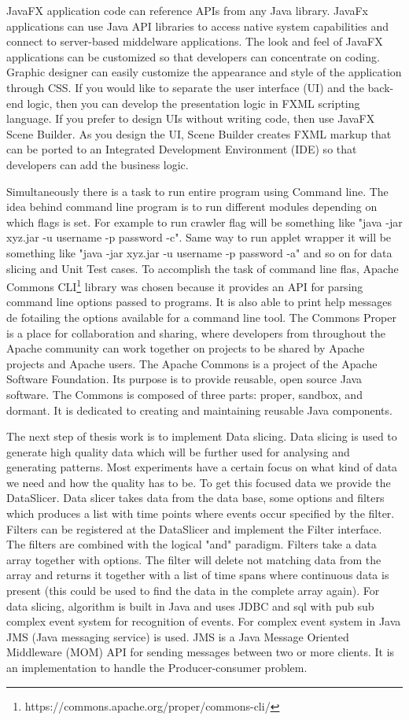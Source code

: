 \documentclass[article,type=msc,colorback,accentcolor=tud9c,twoside,11pt]{tudthesis}
\begin{document}
	JavaFX application code can reference APIs from any Java library. JavaFx applications can use Java API libraries to access native system capabilities and connect to server-based middelware applications. The look and feel of JavaFX applications can be customized so that developers can concentrate on coding. Graphic designer can easily customize the appearance and style of the application through CSS. If you would like to separate the user interface (UI) and the back-end logic, then you can develop the presentation logic in FXML scripting language. If you prefer to design UIs without writing code, then use JavaFX Scene Builder. As you design the UI, Scene Builder creates FXML markup that can be ported to an Integrated Development Environment (IDE) so that developers can add the business logic.
	
	Simultaneously there is a task to run entire program using Command line. The idea behind command line program is to run different modules depending on which flags is set. For example to run crawler flag will be something like "java -jar xyz.jar -u username -p password -c". Same way to run applet wrapper it will be something like  "java -jar xyz.jar -u username -p password -a" and so on for data slicing and Unit Test cases. To accomplish the task of command line flas, Apache Commons CLI\footnote{https://commons.apache.org/proper/commons-cli/} library was chosen because it provides an API for parsing command line options passed to programs. It is also able to print help messages de fotailing the options available for a command line tool. The Commons Proper is a place for collaboration and sharing, where developers from throughout the Apache community can work together on projects to be shared by Apache projects and Apache users. The Apache Commons is a project of the Apache Software Foundation. Its purpose is to provide reusable, open source Java software. The Commons is composed of three parts: proper, sandbox, and dormant. It is dedicated to creating and maintaining reusable Java components.
	
	The next step of thesis work is to implement Data slicing. Data slicing is used to generate high quality data which will be further used for analysing and generating patterns. Most experiments have a certain focus on what kind of data we need and how the quality has to be. To get this focused data we provide the DataSlicer. Data slicer takes data from the data base, some options and filters which produces a list with time points where events occur specified by the filter. Filters can be registered at the DataSlicer and implement the Filter interface. The filters are combined with the logical "and" paradigm. Filters take a data array together with options. The filter will delete not matching data from the array and returns it together with a list of time spans where continuous data is present (this could be used to find the data in the complete array again). For data  slicing, algorithm is built in Java and uses JDBC and sql with pub sub complex event system for recognition of events. For complex event system in Java JMS (Java messaging service) is used. JMS is a Java Message Oriented Middleware (MOM) API for sending messages between two or more clients. It is an implementation to handle the Producer-consumer problem.
	
\end{document}
